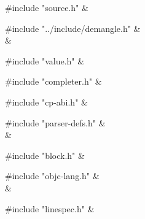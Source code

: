 \medskip
\begin{cxreftabi}
{\stt \#include "source.h"} &\\
\end{cxreftabi}

\medskip
\begin{cxreftabi}
{\stt \#include "../include/demangle.h"} &\\
\hspace*{0.2in}{\stt \#include "../include/libiberty.h"} &\\
\end{cxreftabi}

\medskip
\begin{cxreftabi}
{\stt \#include "value.h"} &\\
\end{cxreftabi}

\medskip
\begin{cxreftabi}
{\stt \#include "completer.h"} &\\
\end{cxreftabi}

\medskip
\begin{cxreftabi}
{\stt \#include "cp-abi.h"} &\\
\end{cxreftabi}

\medskip
\begin{cxreftabi}
{\stt \#include "parser-defs.h"} &\\
\hspace*{0.2in}{\stt \#include "doublest.h"} &\\
\end{cxreftabi}

\medskip
\begin{cxreftabi}
{\stt \#include "block.h"} &\\
\end{cxreftabi}

\medskip
\begin{cxreftabi}
{\stt \#include "objc-lang.h"} &\\
\hspace*{0.2in}{\stt \#include <Availability.h>} &\\
\end{cxreftabi}

\medskip
\begin{cxreftabi}
{\stt \#include "linespec.h"} &\\
\end{cxreftabi}

